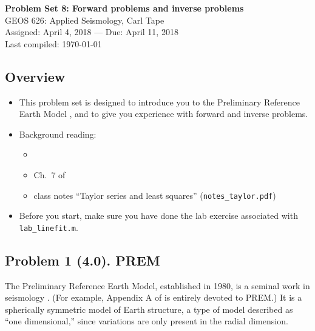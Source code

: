 \documentclass[11pt,titlepage,fleqn]{article}
\begin{document}

\begin{spacing}{1.2}
\centering
{\large \bf Problem Set 8: Forward problems and inverse problems} \\
GEOS 626: Applied Seismology, Carl Tape \\
Assigned: April 4, 2018 --- Due: April 11, 2018 \\
Last compiled: \today
\end{spacing}


\subsection*{Overview}

\begin{itemize}
\item This problem set is designed to introduce you to the Preliminary Reference Earth Model \citep{PREM}, and to give you experience with forward and inverse problems.

\item Background reading:
%
\begin{itemize}
\item \citet{PREM}
\item Ch.~7 of \citet{SteinWysession}
\item class notes ``Taylor series and least squares'' (\verb+notes_taylor.pdf+)
\end{itemize}


\item Before you start, make sure you have done the lab exercise associated with \verb+lab_linefit.m+.

\end{itemize}


\subsection*{Problem 1 (4.0). PREM}

The Preliminary Reference Earth Model, established in 1980, is a seminal work in seismology \citep{PREM}. (For example, Appendix A of \citet{ShearerE2} is entirely devoted to PREM.) It is a spherically symmetric model of Earth structure, a type of model described as ``one dimensional,'' since variations are only present in the radial dimension.
\end{document}
